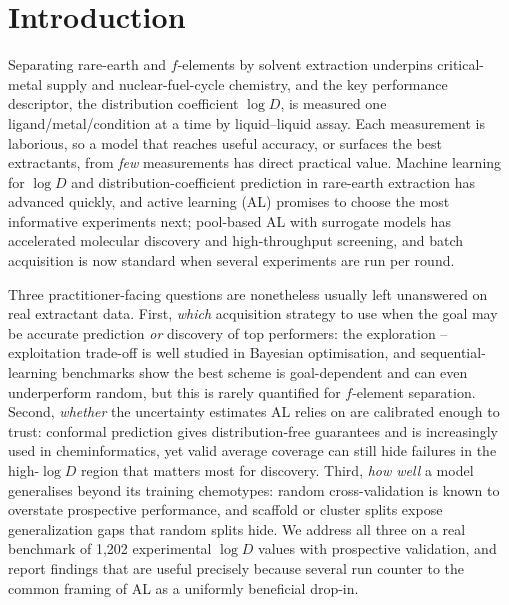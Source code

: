 \documentclass[journal=acsodf,manuscript=article]{achemso}
\begin{document}
\section{Introduction}
Separating rare-earth and $f$-elements by solvent extraction underpins critical-metal
supply and nuclear-fuel-cycle chemistry, and the key performance descriptor, the
distribution coefficient $\log D$, is measured one ligand/metal/condition at a time
by liquid--liquid assay.\cite{Panak_2013} Each measurement is laborious, so a model
that reaches useful accuracy, or surfaces the best extractants, from \emph{few}
measurements has direct practical value. Machine learning for $\log D$ and
distribution-coefficient prediction in rare-earth extraction has advanced
quickly,\cite{Liu_2022,Udawattha_2025,Chaube_2020,Edaugal_2025} and active learning
(AL)\cite{Settles_2009,Reker_2020} promises to choose the most informative
experiments next; pool-based AL with surrogate models has accelerated molecular
discovery and high-throughput screening,\cite{Graff_2021,Rohr_2020,Bayley_2024} and
batch acquisition is now standard when several experiments are run per
round.\cite{Bailey_2023}

Three practitioner-facing questions are nonetheless usually left unanswered on real
extractant data. First, \emph{which} acquisition strategy to use when the goal may be
accurate prediction \emph{or} discovery of top performers: the exploration
--exploitation trade-off is well studied in Bayesian
optimisation,\cite{DeAth_2021,Jones_1998,Shahriari_2016} and sequential-learning
benchmarks show the best scheme is goal-dependent and can even underperform
random,\cite{Rohr_2020} but this is rarely quantified for $f$-element separation.
Second, \emph{whether} the uncertainty estimates AL relies on are calibrated enough
to trust: conformal prediction gives distribution-free
guarantees\cite{Vovk_2005,Lei_2018,Angelopoulos_2023} and is increasingly used in
cheminformatics,\cite{Norinder_2014,Arvidsson_McShane_2024,Sun_2017} yet valid
average coverage can still hide failures in the high-$\log D$ region that matters most
for discovery. Third, \emph{how well} a model generalises beyond its training
chemotypes: random cross-validation is known to overstate prospective
performance,\cite{Sheridan_2013} and scaffold or cluster splits expose generalization
gaps that random splits hide.\cite{Wu_2018,Guo_2024,Guo_2025} We address all three on
a real benchmark of 1{,}202 experimental $\log D$ values with prospective validation,
and report findings that are useful precisely because several run counter to the
common framing of AL as a uniformly beneficial drop-in.
\end{document}
